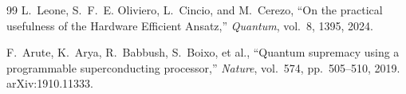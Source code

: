 \documentclass[11pt]{article}
\begin{document}
\begin{thebibliography}{99}
L.~Leone, S.~F.~E. Oliviero, L.~Cincio, and M.~Cerezo,
\newblock ``On the practical usefulness of the Hardware Efficient Ansatz,''
\newblock \emph{Quantum}, vol.~8, 1395, 2024.

F.~Arute, K.~Arya, R.~Babbush, S.~Boixo, et al.,
\newblock ``Quantum supremacy using a programmable superconducting processor,''
\newblock \emph{Nature}, vol.~574, pp.~505--510, 2019. arXiv:1910.11333.
\end{thebibliography}
\end{document}
